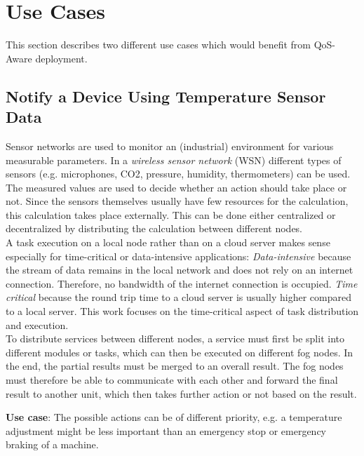 \chapter{Use Cases\label{cha:use-cases}}

This section describes two different use cases which would benefit from QoS-Aware deployment.

\section{Notify a Device Using Temperature Sensor Data\label{sec:sensordata}}

Sensor networks are used to monitor an (industrial) environment for various measurable parameters. In a \textit{wireless sensor network} (WSN) different types of sensors (e.g. microphones, CO2, pressure, humidity, thermometers) can be used. The measured values are used to decide whether an action should take place or not. Since the sensors themselves usually have few resources for the calculation, this calculation takes place externally. This can be done either centralized or decentralized by distributing the calculation between different nodes.\\

A task execution on a local node rather than on a cloud server makes sense especially for time-critical or data-intensive applications:
\textit{Data-intensive} because the stream of data remains in the local network and does not rely on an internet connection.
Therefore, no bandwidth of the internet connection is occupied.
\textit{Time critical} because the round trip time to a cloud server is usually higher compared to a local server. This work focuses on the time-critical aspect of task distribution and execution.\\

To distribute services between different nodes, a service must first be split into different modules or tasks, which can then be executed on different fog nodes.
In the end, the partial results must be merged to an overall result.
The fog nodes must therefore be able to communicate with each other and forward the final result to another unit, which then takes further action or not based on the result.

\textbf{Use case}: The possible actions can be of different priority, e.g. a temperature adjustment might be less important than an emergency stop or emergency braking of a machine.\\

